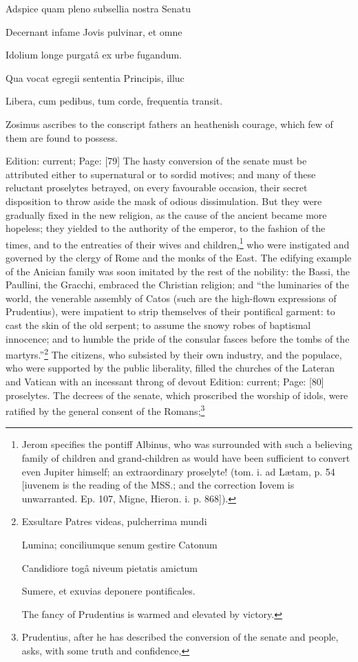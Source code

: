 {{}Adspice quam pleno subsellia nostra Senatu

Decernant infame Jovis pulvinar, et omne

Idolium longe purgatâ ex urbe fugandum.

Qua vocat egregii sententia Principis, illuc

Libera, cum pedibus, tum corde, frequentia transit.

Zosimus ascribes to the conscript fathers an heathenish courage, which few of them are found to possess.} Edition: current; Page: [79] The hasty conversion of the senate must be attributed either to supernatural or to sordid motives; and many of these reluctant proselytes betrayed, on every favourable occasion, their secret disposition to throw aside the mask of odious dissimulation. But they were gradually fixed in the new religion, as the cause of the ancient became more hopeless; they yielded to the authority of the emperor, to the fashion of the times, and to the entreaties of their wives and children,\footnote{Jerom specifies the pontiff Albinus, who was surrounded with such a believing family of children and grand-children as would have been sufficient to convert even Jupiter himself; an extraordinary proselyte! (tom. i. ad Lætam, p. 54 [iuvenem is the reading of the MSS.; and the correction Iovem is unwarranted. Ep. 107, Migne, Hieron. i. p. 868]).} who were instigated and governed by the clergy of Rome and the monks of the East. The edifying example of the Anician family was soon imitated by the rest of the nobility: the Bassi, the Paullini, the Gracchi, embraced the Christian religion; and \texthebrew{“}the luminaries of the world, the venerable assembly of Catos (such are the high-flown expressions of Prudentius), were impatient to strip themselves of their pontifical garment: to cast the skin of the old serpent; to assume the snowy robes of baptismal innocence; and to humble the pride of the consular fasces before the tombs of the martyrs.\texthebrew{}”\footnote{Exsultare Patres videas, pulcherrima mundi

Lumina; conciliumque senum gestire Catonum

Candidiore togâ niveum pietatis amictum

Sumere, et exuvias deponere pontificales.

The fancy of Prudentius is warmed and elevated by victory.} The citizens, who subsisted by their own industry, and the populace, who were supported by the public liberality, filled the churches of the Lateran and Vatican with an incessant throng of devout Edition: current; Page: [80] proselytes. The decrees of the senate, which proscribed the worship of idols, were ratified by the general consent of the Romans;\footnote{Prudentius, after he has described the conversion of the senate and people, asks, with some truth and confidence,

}
